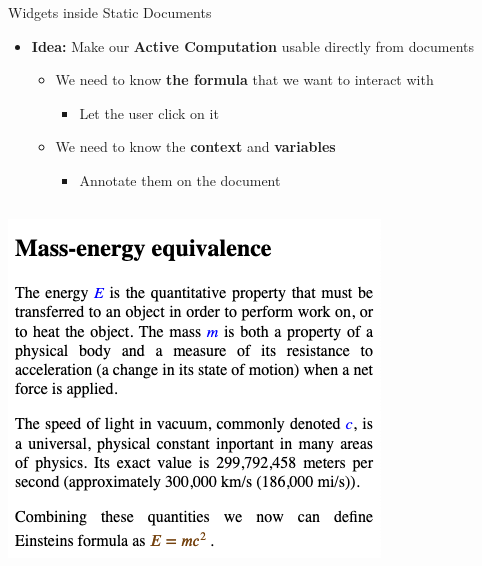 \documentclass{beamer}
\begin{document}
    \begin{frame}[fragile]{Widgets inside Static Documents}
        \begin{itemize}
            \item \textbf{Idea: } Make our \textbf{Active Computation} usable directly from documents
            \begin{itemize}
                \item We need to know \textbf{the formula} that we want to interact with
                \begin{itemize}
                    \item Let the user click on it
                \end{itemize}
                \item We need to know the \textbf{context} and \textbf{variables}
                \begin{itemize}
                    \item Annotate them on the document
                \end{itemize}
            \end{itemize}
        \end{itemize}

        \begin{columns}
            \centering
            \includegraphics[scale=0.25]{images/doc}
            
        \end{columns}
    \end{frame}
\end{document}
